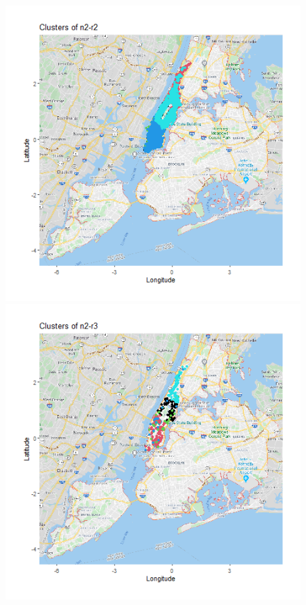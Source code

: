 \documentclass{FR16}
\begin{document}
\begin{itemize}
\begin{figure}[!htb]
\begin{minipage}{0.33\textwidth}
   \end{minipage}
   \begin{minipage}{0.33\textwidth}
     \centering
     \includegraphics[width=1\linewidth]{figures/clust-n2-r2.png}
   \end{minipage}
 \begin{minipage}{0.33\textwidth}
     \centering
     \includegraphics[width=1\linewidth]{figures/clust-n2-r3.png} 

\end{minipage}
\end{figure}
\end{itemize}
\end{document}
